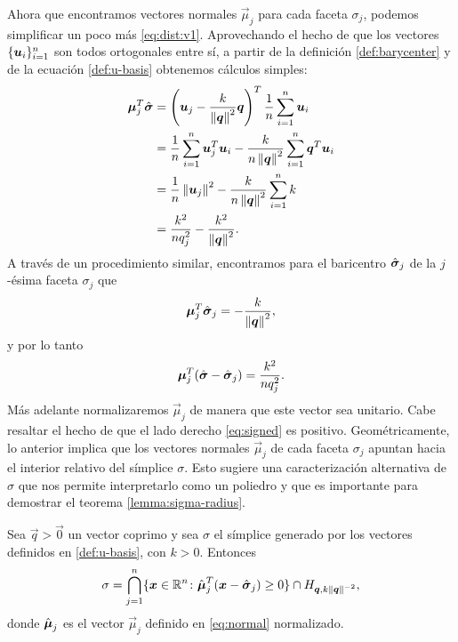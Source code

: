 Ahora que encontramos vectores normales $\vec{\mu}_j$ para cada faceta $\sigma_j$, podemos
simplificar un poco más \eqref{eq:dist:v1}. Aprovechando el hecho de que los vectores
$\lbrace \boldsymbol{u}_i \rbrace_{i=1}^{n}$ son todos ortogonales entre sí, a partir de la
definición \ref{def:barycenter} y de la ecuación \eqref{def:u-basis} obtenemos cálculos
simples:
\begin{align*}
	\boldsymbol{\mu}_j^T\hat{\boldsymbol{ \sigma }}
	&=
	\left(\boldsymbol{u}_j - \frac{k}{\left\lVert \boldsymbol{q} \right\rVert^2}\boldsymbol{q}\right)^T \frac{1}{n}\sum_{i=1}^{n}\boldsymbol{u}_i \\
	&=
	\frac{1}{n}\sum_{i=1}^{n}\boldsymbol{u}_j^T\boldsymbol{u}_i - \frac{k}{n\left\lVert \boldsymbol{q} \right\rVert^2}
	\sum_{i=1}^{n}\boldsymbol{q}^T\boldsymbol{u}_i \\
	&= \frac{1}{n}\left\lVert \boldsymbol{u}_j \right\rVert^2 - \frac{k}{n\left\lVert \boldsymbol{q} \right\rVert^2}\sum_{i=1}^{n}k \\
	&= \frac{k^2}{nq_j^2} - \frac{k^2}{\left\lVert \boldsymbol{q} \right\rVert^2}.
\end{align*}
A través de un procedimiento similar, encontramos para el baricentro
$\hat{\boldsymbol{ \sigma }}_j$ de la $j$-ésima faceta $\sigma_j$ que
\begin{equation}
	\label{eq:facetaux}
	\boldsymbol{\mu}_j^T\hat{\boldsymbol{ \sigma }}_j = -\frac{k}{\left\lVert \boldsymbol{q} \right\rVert^2},
\end{equation}
y por lo tanto
\begin{equation}
	\label{eq:signed}
	\boldsymbol{\mu}_j^T(\hat{\boldsymbol{ \sigma }} - \hat{\boldsymbol{ \sigma }}_j) = \frac{k^2}{nq_j^2}.
\end{equation}
Más adelante normalizaremos $\vec{\mu}_j$ de manera que este vector sea unitario. Cabe resaltar el
hecho de que el lado derecho \eqref{eq:signed} es positivo. Geométricamente, lo anterior implica
que los vectores normales $\vec{\mu}_j$ de cada faceta $\sigma_j$ apuntan hacia el interior relativo
del símplice $\sigma$. Esto sugiere una caracterización alternativa de $\sigma$ que nos permite
interpretarlo como un poliedro y que es importante para demostrar el teorema \ref{lemma:sigma-radius}.
\begin{lemma}
	\label{lemma:sigmachar2}
	Sea $\vec{q} > \vec{0}$ un vector coprimo y sea $\sigma$ el símplice generado por los vectores
	definidos en \eqref{def:u-basis}, con $k > 0$. Entonces
	\begin{equation}
		\label{eq:sigmachar2}
		\sigma = \bigcap_{j=1}^{n}
		\lbrace \boldsymbol{x} \in \mathbb{R}^n \colon \hat{\boldsymbol{\mu}}_j^T(\boldsymbol{x} - \hat{\boldsymbol{ \sigma }}_j) \geq 0 \rbrace
		\cap H_{\boldsymbol{q}, k\left\lVert \boldsymbol{q} \right\rVert^{-2}},
	\end{equation}
	donde $\hat{\boldsymbol{\mu}}_j$ es el vector $\vec{\mu}_j$ definido en \eqref{eq:normal} normalizado.
\end{lemma}
